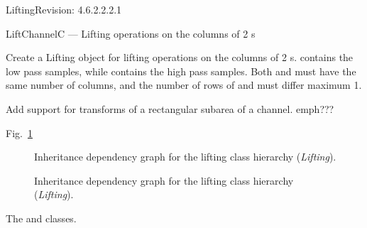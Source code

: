 \begin{manpage}{\libtitle}{Lifting}{$ $Revision: 4.6.2.2.2.1 $ $}
\separator

\subtitle{Name}
    LiftChannelC --- Lifting operations on the columns of 2 s


\subtitle{Declaration}

    Create a Lifting object for lifting operations on the columns of 2
    s.
     contains the low pass samples, while 
    contains the high pass samples. Both  and 
    must have the same number of columns, and the number of rows of
     and  must differ maximum 1.


\subtitle{Plans}
    Add support for transforms of a rectangular subarea of a channel.
    emph{???}


\subtitle{Dependency \\ Graphs}
    \begin{description}
    \item[Fig.~\ref{fig:Lifting}] Inheritance dependency graph for the lifting
    class hierarchy (\emph{Lifting}).
    \end{description}

    \begin{figure}[h]\begin{center}
    \caption{Inheritance dependency graph for the lifting class hierarchy
    (\emph{Lifting}).}
    \label{fig:Lifting}
    \end{center}\end{figure}


\subtitle{See Also}
    The  and  classes.


\subtitle{Revision}

\end{manpage}

